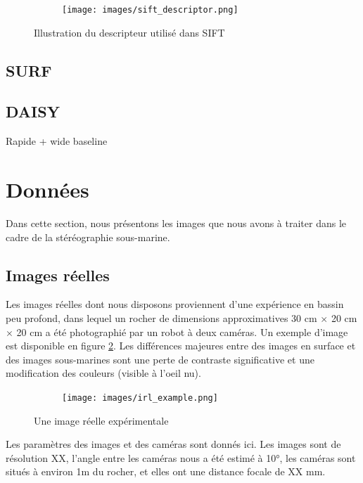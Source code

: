 \documentclass[
	a4paper, %
	10pt, %
	unnumberedsections, %
	twoside, %
]{LTJournalArticle}
\begin{document}
\begin{figure}
	\centering
	\begin{subfigure}[H]{\columnwidth}
		\centering
		\texttt{[image: images/sift\_descriptor.png]}
	\end{subfigure}
	\label{figure:sift_descriptor}
	\caption{Illustration du descripteur utilisé dans SIFT}
\end{figure}

\subsection{SURF}

\subsection{DAISY}

Rapide + wide baseline

\section{Données}

Dans cette section, nous présentons les images que nous avons à traiter dans le cadre de la stéréographie sous-marine.

\subsection{Images réelles}

Les images réelles dont nous disposons proviennent d'une expérience en bassin peu profond, dans lequel un rocher de dimensions approximatives 30 cm $\times$ 20 cm $\times$ 20 cm a été photographié par un robot à deux caméras. Un exemple d'image est disponible en figure \ref{figure:irl_example}.
Les différences majeures entre des images en surface et des images sous-marines sont une perte de contraste significative et une modification des couleurs (visible à l'oeil nu).

\begin{figure}
	\centering
	\begin{subfigure}[H]{\columnwidth}
		\centering
		\texttt{[image: images/irl\_example.png]}
	\end{subfigure}
	\label{figure:irl_example}
	\caption{Une image réelle expérimentale}
\end{figure}

Les paramètres des images et des caméras sont donnés ici.
Les images sont de résolution XX, l'angle entre les caméras nous a été estimé à 10°, les caméras sont situés à environ 1m du rocher, et elles ont une distance focale de XX mm.
\end{document}
